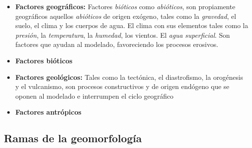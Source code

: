 \documentclass[16pt,]{krantz}
\providecommand{\tightlist}{%
  \setlength{\itemsep}{0pt}\setlength{\parskip}{0pt}}
\theoremstyle{definition}
\theoremstyle{definition}
\theoremstyle{definition}
\theoremstyle{definition}
\theoremstyle{remark}
\begin{document}
\begin{itemize}
\tightlist
\item
  \textbf{Factores geográficos:} Factores \emph{bióticos} como \emph{abióticos}, son propiamente geográficos aquellos \emph{abióticos} de origen exógeno, tales como la \emph{gravedad}, el suelo, el clima y los cuerpos de agua. El clima con sus elementos tales como la \emph{presión}, la \emph{temperatura}, la \emph{humedad}, los vientos. El \emph{agua superficial}. Son factores que ayudan al modelado, favoreciendo los procesos erosivos.
\item
  \textbf{Factores bióticos}
\item
  \textbf{Factores geológicos:} Tales como la tectónica, el diastrofismo, la orogénesis y el vulcanismo, son procesos constructivos y de origen endógeno que se oponen al modelado e interrumpen el ciclo geográfico
\item
  \textbf{Factores antrópicos}
\end{itemize}

\hypertarget{ramas-de-la-geomorfologuxeda}{%
\subsection{Ramas de la geomorfología}\label{ramas-de-la-geomorfologuxeda}}
\end{document}
